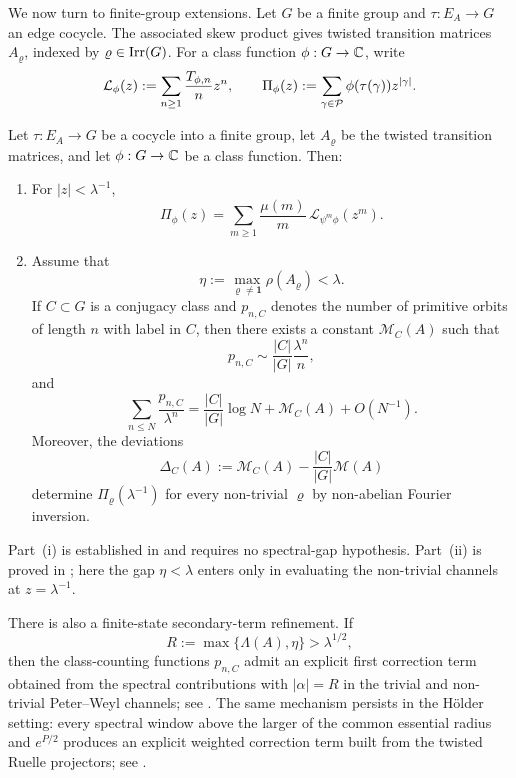 We now turn to finite-group extensions. Let \(G\) be a finite group and
\(\tau:E_A\to G\) an edge cocycle. The associated skew product gives
twisted transition matrices \(A_\varrho\), indexed by
\(\varrho\in\operatorname{Irr}(G)\). For a class function \(\phi:G\to\mathbb{C}\), write
\[
  \mathcal L_\phi(z)
  :=\sum_{n\ge 1}\frac{T_{\phi,n}}{n}z^n,
  \qquad
  \Pi_\phi(z):=\sum_{\gamma\in\mathcal P}\phi(\tau(\gamma))z^{|\gamma|}.
\]

\begin{theorem}
  \label{thm:intro-finite-group}
  Let \(\tau:E_A\to G\) be a cocycle into a finite group, let
  \(A_\varrho\) be the twisted transition matrices, and let
  \(\phi:G\to\mathbb{C}\) be a class function. Then:
  \begin{enumerate}[label=\textup{(\roman*)}]
    \item For \(|z|<\lambda^{-1}\),
      \[
        \Pi_\phi(z)
        =\sum_{m\ge 1}\frac{\mu(m)}{m}\,
          \mathcal L_{\psi^m\phi}(z^m).
      \]
    \item Assume that
      \[
        \eta:=\max_{\varrho\neq\mathbf 1}\rho(A_\varrho)<\lambda.
      \]
      If \(C\subset G\) is a conjugacy class and \(p_{n,C}\) denotes
      the number of primitive orbits of length \(n\) with label in
      \(C\), then there exists a constant \(\mathcal M_C(A)\) such that
      \[
        p_{n,C}\sim \frac{|C|}{|G|}\frac{\lambda^n}{n},
      \]
      and
      \[
        \sum_{n\le N}\frac{p_{n,C}}{\lambda^n}
        =\frac{|C|}{|G|}\log N+\mathcal M_C(A)+O(N^{-1}).
      \]
      Moreover, the deviations
      \[
        \Delta_C(A):=\mathcal M_C(A)-\frac{|C|}{|G|}\mathcal M(A)
      \]
      determine \(\Pi_\varrho(\lambda^{-1})\) for every non-trivial
      \(\varrho\) by non-abelian Fourier inversion.
  \end{enumerate}
\end{theorem}

Part~\textup{(i)} is established in
 and requires no spectral-gap
hypothesis. Part~\textup{(ii)} is proved in
; here the
gap \(\eta<\lambda\) enters only in evaluating the non-trivial channels
at \(z=\lambda^{-1}\).

There is also a finite-state secondary-term refinement. If
\[
  R:=\max\{\Lambda(A),\eta\}>\lambda^{1/2},
\]
then the class-counting functions \(p_{n,C}\) admit an explicit first
correction term obtained from the spectral contributions with
\(|\alpha|=R\) in the trivial and non-trivial Peter--Weyl channels; see
.
The same mechanism persists in the H\"older setting: every spectral
window above the larger of the common essential radius and \(e^{P/2}\)
produces an explicit weighted correction term built from the twisted
Ruelle projectors; see .

